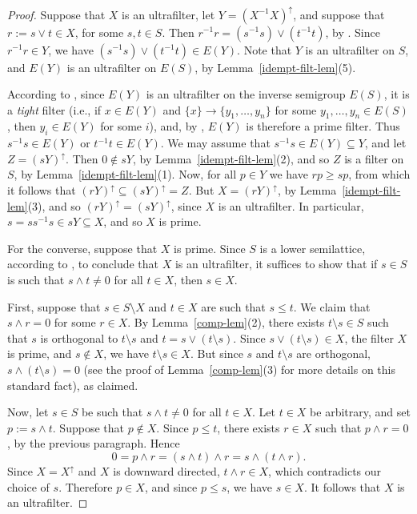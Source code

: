 \documentclass[a4paper,reqno,12pt]{amsart}
\numberwithin{equation}{section}
\theoremstyle{plain}
\theoremstyle{definition}
\begin{document}
\begin{proof}
Suppose that $X$ is an ultrafilter, let $Y = (X^{-1} X)^{\uparrow}$, and suppose that $r := s \lor t \in X$, for some $s,t \in S$. Then $r^{-1}r = (s^{-1}s) \lor (t^{-1}t)$, by \cite[Lemma 2.4.4(1)]{Lawson1}. Since $r^{-1}r \in Y$, we have $(s^{-1}s) \lor (t^{-1}t) \in E(Y)$. Note that $Y$ is an ultrafilter on $S$, and $E(Y)$ is an ultrafilter on $E(S)$, by Lemma~\ref{idempt-filt-lem}(5). 

According to \cite[Lemma 2.19(1)]{Lawson3}, since $E(Y)$ is an ultrafilter on the inverse semigroup $E(S)$, it is a \emph{tight} filter (i.e., if $x \in E(Y)$ and $\{x\} \to \{y_1, \dots, y_n\}$ for some $y_1, \dots, y_n \in E(S)$, then $y_i \in E(Y)$ for some $i$), and, by \cite[Lemma 2.41]{Lawson3}, $E(Y)$ is therefore a prime filter. Thus $s^{-1}s \in E(Y)$ or $t^{-1}t \in E(Y)$. We may assume that $s^{-1}s \in E(Y) \subseteq Y$, and let $Z = (sY)^{\uparrow}$. Then $0 \notin sY$, by Lemma~\ref{idempt-filt-lem}(2), and so $Z$ is a filter on $S$, by Lemma~\ref{idempt-filt-lem}(1). Now, for all $p \in Y$ we have $rp \geq sp$, from which it follows that $(rY)^{\uparrow} \subseteq (sY)^{\uparrow} = Z$. But $X = (rY)^{\uparrow}$, by Lemma~\ref{idempt-filt-lem}(3), and so $(rY)^{\uparrow} = (sY)^{\uparrow}$, since $X$ is an ultrafilter. In particular, $s = ss^{-1}s \in sY \subseteq X$, and so $X$ is prime.

For the converse, suppose that $X$ is prime. Since $S$ is a lower semilattice, according to \cite[Lemma 9.1.2]{Lawson1}, to conclude that $X$ is an ultrafilter, it suffices to show that if $s\in S$ is such that $s \land t \neq 0$ for all $t \in X$, then $s \in X$.

First, suppose that $s \in S \setminus  X$ and $t \in X$ are such that $s \leq t$. We claim that $s \land r = 0$ for some $r \in X$. By Lemma~\ref{comp-lem}(2), there exists $t \setminus s \in S$ such that $s$ is orthogonal to $t \setminus s$ and $t = s \lor (t \setminus s)$. Since $s \lor (t \setminus s) \in X$, the filter $X$ is prime, and $s \notin X$, we have $t \setminus s \in X$. But since $s$ and $t \setminus s$ are orthogonal, $s \land (t \setminus s) = 0$ (see the proof of Lemma~\ref{comp-lem}(3) for more details on this standard fact), as claimed.

Now, let $s \in S$ be such that $s \land t \neq 0$ for all $t \in X$. Let $t \in X$ be arbitrary, and set $p := s \land t$. Suppose that $p \notin X$. Since $p \leq t$, there exists $r \in X$ such that $p \land r = 0$, by the previous paragraph. Hence
\[0 = p \land r =  (s \land t) \land r = s \land (t \land r).\]
Since $X = X^{\uparrow}$ and $X$ is downward directed, $t \land r \in X$, which contradicts our choice of $s$. Therefore $p \in X$, and since $p \leq s$, we have $s \in X$. It follows that $X$ is an ultrafilter.
\end{proof}
\end{document}
